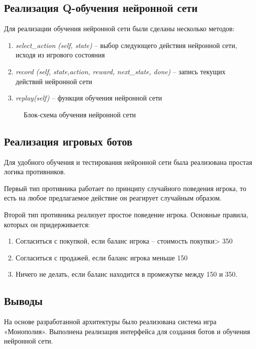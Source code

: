 \begin{Large}
\subsection{Реализация Q-обучения нейронной сети}
Для реализации обучения нейронной сети были сделаны несколько методов:
\begin{enumerate}
    \item \textit{select\_action (self, state)} – выбор следующего действия нейронной сети, исходя из игрового состояния
    \item \textit{record (self, state,action, reward, next\_state, done)} – запись текущих действий нейронной сети
    \item \textit{replay(self)} – функция обучения нейронной сети
\end{enumerate}
\begin{figure}[h!]
    \caption{Блок-схема обучения нейронной сети}
\end{figure}
\newpage
\subsection{Реализация игровых ботов}
Для удобного обучения и тестирования нейронной сети была реализована простая логика противников. 

Первый тип противника работает по принципу случайного поведения игрока, то есть на любое предлагаемое действие он реагирует случайным образом.

Второй тип противника реализует простое поведение игрока. Основные правила, которых он придерживается:
\begin{enumerate}
    \item Согласиться с покупкой, если баланс игрока – стоимость покупки> 350
    \item Согласиться с продажей, если баланс игрока меньше 150
    \item Ничего не делать, если баланс находится в промежутке между 150 и 350.
\end{enumerate}
\subsection*{Выводы}
На основе разработанной архитектуры было реализована система игра «Монополия». Выполнена реализация интерфейса для создания ботов и обучения нейронной сети.
\end{Large}